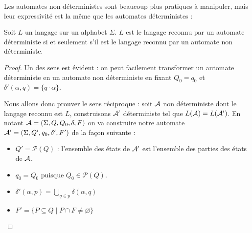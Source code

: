  Les automates non déterministes sont beaucoup plus pratiques à manipuler, mais leur expressivité est la même que les automates déterministes :

 \begin{them}
    Soit $L$ un langage sur un alphabet $\Sigma$. $L$ est le langage reconnu par un automate déterministe si et seulement s'il est le langage reconnu par un automate non déterministe.
 \end{them}

 \begin{proof}
    Un des sens est évident : on peut facilement transformer un automate déterministe en un automate non déterministe en fixant $Q_0=q_0$ et $\delta'(\alpha,q) = \{q\cdot \alpha\}$.

    Nous allons donc prouver le sens réciproque : soit $\mathcal A$ non déterministe dont le langage reconnu est $L$, construisons $\mathcal A'$ déterministe tel que $L(\mathcal A) = L(\mathcal A')$. En notant $\mathcal A = (\Sigma,Q,Q_0,\delta,F)$ on va construire notre automate $\mathcal A' = (\Sigma,Q',q_0,\delta',F')$ de la façon suivante :
    \begin{itemize}[label=$\bullet$]
        \item $Q'=\mathcal P(Q)$ : l'ensemble des états de $\mathcal A'$ est l'ensemble des parties des états de $\mathcal A$.
        \item $q_0 = Q_0$ puisque $Q_0\in \mathcal P(Q)$.
        \item $\delta'(\alpha,p) = \displaystyle{\bigcup_{q\in p}\delta(\alpha,q)}$
        \item $F' = \{P\subseteq Q\mid P\cap F \neq \varnothing\}$
    \end{itemize}


\end{proof}

